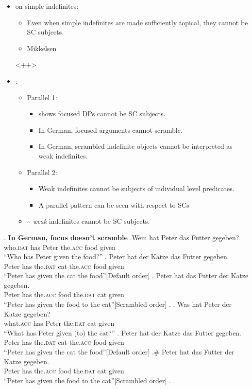 \documentclass[GPFinal]{subfiles}
\begin{document}
\begin{itemize}
  \item \textcite{mikkelsen2004specifying} on simple indefinites:
    \begin{itemize}
      \item Even when simple indefinites are made sufficiently topical, they cannot be SC subjects.
      \item Mikkelsen 
    \end{itemize}<++>
  \item \textcite{heycockkroch1999pseudocleft}:
    \begin{itemize}
      \item Parallel 1:
	\begin{itemize}
	  \item \Last shows focused DPs cannot be SC subjects.
	  \item In German, focused arguments cannot scramble. \parencite{lenerz1977zur}
	  \item In German, scrambled indefinite objects cannot be interpreted as weak indefinites. \parencite{dehoop1992case,diesing1992indefinites}
	\end{itemize}
      \item Parallel 2:
	\begin{itemize}
	  \item Weak indefinites cannot be subjects of individual level predicates. \parencite{milsark1974existential}
	  \item A parallel pattern can be seen with respect to SCs
	\end{itemize}
      \item $\therefore$ \textit{weak} indefinites cannot be SC subjects.
    \end{itemize}
\end{itemize}
\ex. \textbf{In German, focus doesn't scramble}
\ag.Wem hat Peter das Futter gegeben?\\
who.\textsc{dat} has Peter the.\textsc{acc} food given\\
``Who has Peter given the food?''
\ag. Peter hat der Katze das Futter gegeben.\\
Peter has the.\textsc{dat} cat the.\textsc{acc} food given\\
``Peter has given the cat the food''\hfill[Default order]
\bg. Peter hat das Futter der Katze gegeben.\\
Peter has the.\textsc{acc} food the.\textsc{dat} cat given\\
``Peter has given the food to the cat''\hfill[Scrambled order]
\z.
\bg. Was hat Peter der Katze gegeben?\\
what.\textsc{acc} has Peter the.\textsc{dat} cat given\\
``What has Peter given (to) the cat?''
\ag. Peter hat der Katze das Futter gegeben.\\
Peter has the.\textsc{dat} cat the.\textsc{acc} food given\\
``Peter has given the cat the food''\hfill[Default order]
\bg.\# Peter hat das Futter der Katze gegeben.\\
Peter has the.\textsc{acc} food the.\textsc{dat} cat given\\
``Peter has given the food to the cat''\hfill[Scrambled order]
\z.
\z.
\end{document}
